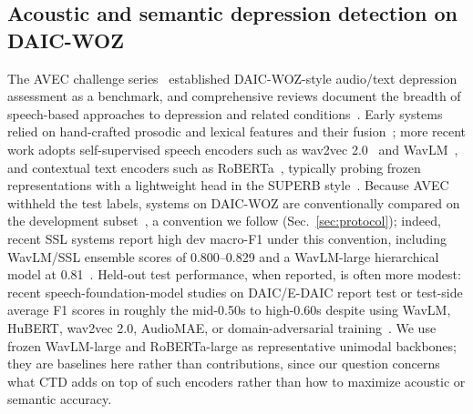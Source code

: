\documentclass{article}
\begin{document}
\subsection{Acoustic and semantic depression detection on DAIC-WOZ}
The AVEC challenge series~\cite{valstar2013avec,valstar2016avec} established DAIC-WOZ-style audio/text depression assessment as a benchmark, and comprehensive reviews document the breadth of speech-based approaches to depression and related conditions~\cite{cummins2015review}. 
Early systems relied on hand-crafted prosodic and lexical features and their fusion~\cite{alhanai2018detecting}; more recent work adopts self-supervised speech encoders such as wav2vec 2.0~\cite{baevski2020wav2vec} and WavLM~\cite{chen2022wavlm}, and contextual text encoders such as RoBERTa~\cite{liu2019roberta}, typically probing frozen representations with a lightweight head in the SUPERB style~\cite{yang2021superb}. 
Because AVEC withheld the test labels, systems on DAIC-WOZ are conventionally compared on the development subset~\cite{gong2017topic,shen2022automatic,wu2023ssl,li2025hierarchical}, a convention we follow (Sec.~\ref{sec:protocol}); indeed, recent SSL systems report high dev macro-F1 under this convention, including WavLM/SSL ensemble scores of 0.800--0.829 and a WavLM-large hierarchical model at 0.81~\cite{wu2023ssl,li2025hierarchical}. 
Held-out test performance, when reported, is often more modest: recent speech-foundation-model studies on DAIC/E-DAIC report test or test-side average F1 scores in roughly the mid-0.50s to high-0.60s despite using WavLM, HuBERT, wav2vec 2.0, AudioMAE, or domain-adversarial training~\cite{dumpala2025ttt,kim2025dat}. 
We use frozen WavLM-large and RoBERTa-large as representative unimodal backbones; they are baselines here rather than contributions, since our question concerns what CTD adds on top of such encoders rather than how to maximize acoustic or semantic accuracy.

\end{document}
